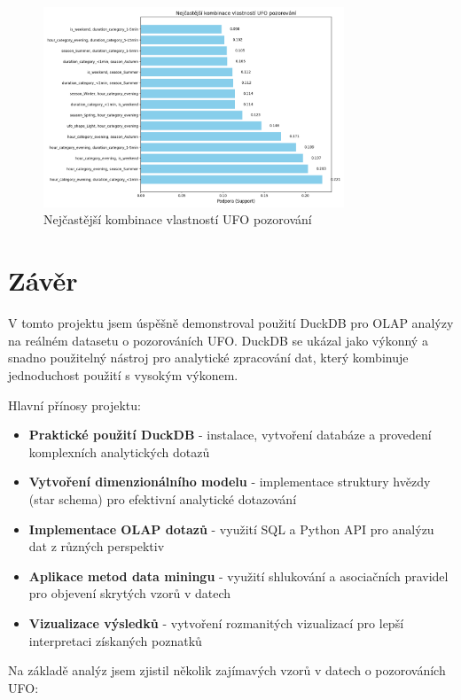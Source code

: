 \documentclass[a4paper,12pt]{article}
\begin{document}
\begin{figure}[h]
\centering
\includegraphics[width=0.8\textwidth]{../images/ufo_frequent_itemsets.png}
\caption{Nejčastější kombinace vlastností UFO pozorování}
\end{figure}

\FloatBarrier
\section{Závěr}
V tomto projektu jsem úspěšně demonstroval použití DuckDB pro OLAP analýzy na reálném datasetu o pozorováních UFO. DuckDB se ukázal jako výkonný a snadno použitelný nástroj pro analytické zpracování dat, který kombinuje jednoduchost použití s vysokým výkonem.

Hlavní přínosy projektu:

\begin{itemize}
    \item \textbf{Praktické použití DuckDB} - instalace, vytvoření databáze a provedení komplexních analytických dotazů
    \item \textbf{Vytvoření dimenzionálního modelu} - implementace struktury hvězdy (star schema) pro efektivní analytické dotazování
    \item \textbf{Implementace OLAP dotazů} - využití SQL a Python API pro analýzu dat z různých perspektiv
    \item \textbf{Aplikace metod data miningu} - využití shlukování a asociačních pravidel pro objevení skrytých vzorů v datech
    \item \textbf{Vizualizace výsledků} - vytvoření rozmanitých vizualizací pro lepší interpretaci získaných poznatků
\end{itemize}

Na základě analýz jsem zjistil několik zajímavých vzorů v datech o pozorováních UFO:
\end{document}
